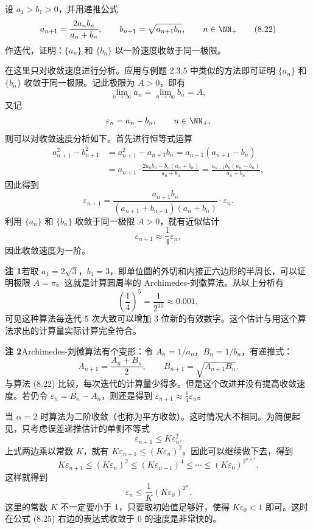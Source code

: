 \begin{xexample}[8.7.1]
设 $a_1>b_1>0$，并用递推公式
\begin{equation}
  a_{n+1}=\frac{2a_nb_n}{a_n+b_n},
  \qquad
  b_{n+1}=\sqrt{a_{n+1}b_n},
  \qquad n\in\NN_+
  \tag{8.22}
  \label{eq:8.22}
\end{equation}
作迭代，证明：$\{a_n\}$ 和 $\{b_n\}$ 以一阶速度收敛于同一极限。
\end{xexample}
\begin{xproof}
在这里只对收敛速度进行分析。应用与例题 2.3.5 中类似的方法即可证明 $\{a_n\}$ 和 $\{b_n\}$ 收敛于同一极限。记此极限为 $A>0$，即有
\[
  \lim_{n\to\infty}a_n=\lim_{n\to\infty}b_n=A,
\]
又记
\[
  \varepsilon_n=a_n-b_n,\qquad n\in\NN_+,
\]
则可以对收敛速度分析如下。首先进行恒等式运算
\begin{align*}
  a_{n+1}^2-b_{n+1}^2
  &=a_{n+1}^2-a_{n+1}b_n=a_{n+1}(a_{n+1}-b_n)\\
  &=a_{n+1}\cdot\frac{2a_nb_n-b_n(a_n+b_n)}{a_n+b_n}
  =\frac{a_{n+1}b_n(a_n-b_n)}{a_n+b_n},
\end{align*}
因此得到
\[
  \varepsilon_{n+1}
  =\frac{a_{n+1}b_n}{(a_{n+1}+b_{n+1})(a_n+b_n)}\cdot\varepsilon_n.
\]
利用 $\{a_n\}$ 和 $\{b_n\}$ 收敛于同一极限 $A>0$，就有近似估计
\[
  \varepsilon_{n+1}\approx\frac14\varepsilon_n,
\]
因此收敛速度为一阶。
\end{xproof}

\begin{xremark}
\textbf{注 1}\quad 若取 $a_1=2\sqrt3$，$b_1=3$，即单位圆的外切和内接正六边形的半周长，可以证明极限 $A=\pi$。这就是计算圆周率的 Archimedes-刘徽算法。从以上分析有
\[
  \left(\frac14\right)^5=\frac1{2^{10}}\approx0.001,
\]
可见这种算法每迭代 5 次大致可以增加 3 位新的有效数字。这个估计与用这个算法求出的计算量实际计算完全符合。

\textbf{注 2}\quad Archimedes-刘徽算法有个变形：令 $A_n=1/a_n$，$B_n=1/b_n$，有递推式：
\begin{equation}
  A_{n+1}=\frac{A_n+B_n}{2},
  \qquad
  B_{n+1}=\sqrt{A_{n+1}B_n}.
  \tag{8.23}
  \label{eq:8.23}
\end{equation}
与算法 (8.22) 比较，每次迭代的计算量少得多。但是这个改进并没有提高收敛速度。若仍令 $\varepsilon_n=B_n-A_n$，则还是得到 $\varepsilon_{n+1}\approx\frac14\varepsilon_n$。
\end{xremark}

当 $\alpha=2$ 时算法为二阶收敛（也称为平方收敛）。这时情况大不相同。为简便起见，只考虑误差递推估计的单侧不等式
\begin{equation}
  \varepsilon_{n+1}\le K\varepsilon_n^2.
  \tag{8.24}
  \label{eq:8.24}
\end{equation}
上式两边乘以常数 $K$，就有 $K\varepsilon_{n+1}\le(K\varepsilon_n)^2$。因此可以继续做下去，得到
\[
  K\varepsilon_{n+1}\le(K\varepsilon_n)^2\le(K\varepsilon_{n-1})^4\le\cdots\le(K\varepsilon_0)^{2^{n+1}}.
\]
这样就得到
\begin{equation}
  \varepsilon_n\le\frac1K(K\varepsilon_0)^{2^n}.
  \tag{8.25}
  \label{eq:8.25}
\end{equation}
这里的常数 $K$ 不一定要小于 1，只要取初始值足够好，使得 $K\varepsilon_0<1$ 即可。这时在公式 (8.25) 右边的表达式收敛于 0 的速度是非常快的。

